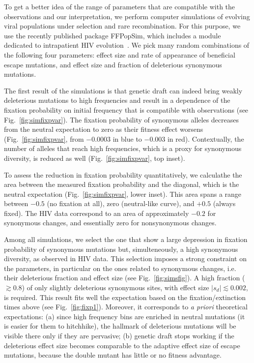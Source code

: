 \documentclass[rmp, twocolumn]{revtex4}
\newcommand{\FIG}[1]{Fig.~\ref{fig:#1}}
\begin{document}
To get a better idea of the range of parameters that are compatible with the
observations and our interpretation, we perform computer simulations of
evolving viral populations under selection and rare recombination. For this
purpose, we use the recently published package FFPopSim, which includes a module
dedicated to intrapatient HIV evolution~\citep{zanini_ffpopsim:_2012}. We
pick many random combinations of the following four parameters: effect
size and rate of appearance of beneficial escape mutations, and effect size
and fraction of deleterious synonymous mutations. 

The first result of the simulations is that genetic draft can indeed bring weakly
deleterious mutations to high frequencies and result in a dependence of the
fixation probability on initial frequency that is compatible with observations
(see \FIG{simfixpvar}).
The fixation probability of synonymous alleles decreases from the neutral
expectation to zero as their fitness effect worsens (\FIG{simfixpvar},
from $-0.0003$ in blue to $-0.003$ in red). Contextually,
the number of alleles that reach high frequencies, which is a proxy for
synonymous diversity, is reduced as well (\FIG{simfixpvar}, top inset).

To assess the reduction in fixation probability quantitatively, we calculathe
the area between the measured fixation probability and the diagonal, which is
the neutral expectation (\FIG{simfixpvar}, lower inset). This area spans a range
between $-0.5$ (no fixation at all), zero (neutral-like curve), and $+0.5$ (always
fixed). The HIV data correspond to an area of approximately $-0.2$ for synonymous
changes, and essentially zero for nonsynonymous changes.

Among all simulations, we select the one that show a large depression in
fixation probability of synonymous mutations but, simulteneously, a high
synonymous diversity, as observed in HIV data. This selection imposes a strong
constraint on the parameters, in particular on the ones related to synonymous
changes, i.e. their deleterious fraction and effect size (see \FIG{simsfig}).
A high fraction ($\gtrsim 0.8$) of only slightly deleterious synonymous sites,
with effect size $|s_d| \lesssim 0.002$, is required. This result fits well
the expectation based on the fixation/extinction times above (see \FIG{fixp1}).
Moreover, it corresponds to {\it a priori} theoretical expectations:
(a) since high frequency bins are enriched in neutral mutations (it is easier for
them to hitchhike), the hallmark of deleterious mutations will be visible there
only if they are pervasive; (b) genetic draft stops working if the
deleterious effect size becomes comparable to the adaptive effect size of escape
mutations, because the double mutant has little or no fitness advantage.
\end{document}
